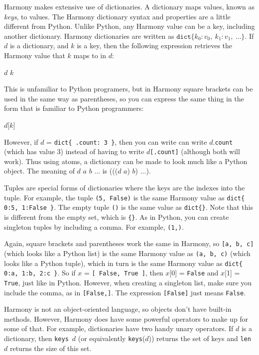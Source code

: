 \documentclass{report}
\newenvironment{code}{
\tcolorbox
}{
\endtcolorbox
}
\begin{document}
Harmony makes extensive use of dictionaries.
A dictionary maps values, known as \emph{keys}, to values.
The Harmony dictionary syntax and properties are a little different from Python.
Unlike Python, any Harmony value can be a key, including another
dictionary.
Harmony dictionaries are written as
$\mathtt{dict}\{ k_0: v_0, ~ k_1: v_1, ~ ... \}$.
If $d$ is a dictionary, and $k$ is a key, then the
following expression retrieves the Harmony value that $k$ maps to in $d$:
\begin{code}
$d$ $k$
\end{code}
This is unfamiliar to Python programers, but in Harmony square brackets can be used
in the same way as parentheses, so you can express the same thing in the form
that is familiar to Python programmers:
\begin{code}
$d$[$k$]
\end{code}
However, if $d$ = \texttt{dict\{ .count: 3 \}}, then you can write
can write $d$.\texttt{count} (which has value 3) instead of having to write
$d$\texttt{[.count]} (although both will work).
Thus using atoms, a dictionary can be made to look much like a Python object.
The meaning of $d$ $a$ $b$ $...$ is ((($d$ $a$) $b$) $...$).

Tuples are special forms of dictionaries where the keys are
the indexes into the tuple.  For example, the tuple
\texttt{(5, False)} is the same Harmony value as
\texttt{dict\{ 0:5, 1:False \}}.
The empty tuple \texttt{()} is the same value as \texttt{dict\{\}}.
Note that this is different from the empty set, which is \texttt{\{\}}.
As in Python, you can create singleton tuples by including a comma.
For example, \texttt{(1,)}.

Again, square brackets and parentheses work the same in Harmony, so
\texttt{[a, b, c]} (which looks like a Python list)
is the same Harmony value as \texttt{(a, b, c)} (which looks like a Python tuple),
which in turn is the same Harmony value as \texttt{dict\{ 0:a, 1:b, 2:c \}}.
So if $x$ = \texttt{[ False, True ]},
then $x$[0] = \texttt{False} and $x$[1] = \texttt{True}, just like in Python.
However, when creating a singleton list, make sure you include the
comma, as in \texttt{[False,]}.  The expression \texttt{[False]} just means
\texttt{False}.

Harmony is not an object-oriented language, so objects don't have
built-in methods.  However, Harmony does have some powerful operators to
make up for some of that.
For example, dictionaries have two handy unary operators.
If $d$ is a
dictionary, then \texttt{keys}~$d$ (or equivalently \texttt{keys}($d$))
returns the set of keys and \texttt{len}~$d$ returns the size of
this set.
\end{document}
